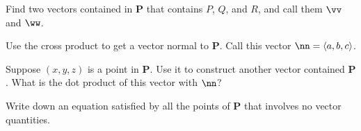 \documentclass[12pt]{exam}
\theoremstyle{definition}
\begin{document}
\begin{questions}
\question Find two vectors contained in $\mathbf{P}$ that contains $P$, $Q$,
and $R$, and call them $\vv$ and $\ww$.

\question Use the cross product to get a vector normal to $\mathbf{P}$. Call
this vector $\nn = \langle a, b, c \rangle$.

\question Suppose $(x, y, z)$ is a point in $\mathbf{P}$. Use it to construct
another vector contained $\mathbf{P}$. What is the dot product of this vector
with $\nn$?

\question Write down an equation satisfied by all the points of $\mathbf{P}$
that involves no vector quantities.

\end{questions} 
\end{document}
